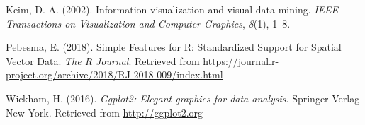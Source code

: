 \documentclass[man]{apa6}
\begin{document}
\begingroup
\setlength{\parindent}{-0.5in}
\setlength{\leftskip}{0.5in}

\hypertarget{refs}{}
\leavevmode\hypertarget{ref-keim2002information}{}%
Keim, D. A. (2002). Information visualization and visual data mining. \emph{IEEE Transactions on Visualization and Computer Graphics}, \emph{8}(1), 1--8.

\leavevmode\hypertarget{ref-R-sf}{}%
Pebesma, E. (2018). Simple Features for R: Standardized Support for Spatial Vector Data. \emph{The R Journal}. Retrieved from \url{https://journal.r-project.org/archive/2018/RJ-2018-009/index.html}

\leavevmode\hypertarget{ref-R-ggplot2}{}%
Wickham, H. (2016). \emph{Ggplot2: Elegant graphics for data analysis}. Springer-Verlag New York. Retrieved from \url{http://ggplot2.org}

\endgroup
\end{document}
